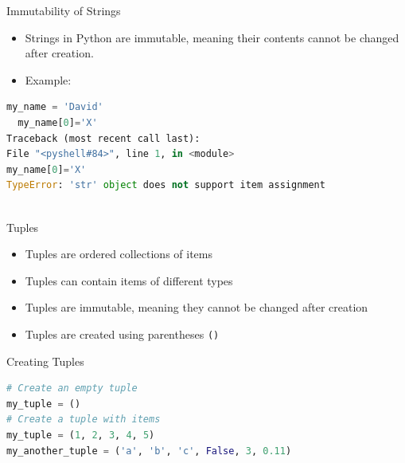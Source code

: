 \begin{frame}[fragile]{Immutability of Strings}
    \begin{itemize}
        \item Strings in Python are immutable, meaning their contents cannot be changed after creation.
        \item Example:
    \end{itemize}
    \begin{lstlisting}[language=Python]
  my_name = 'David'
  my_name[0]='X'
Traceback (most recent call last):
File "<pyshell#84>", line 1, in <module>
my_name[0]='X'
TypeError: 'str' object does not support item assignment
 
    \end{lstlisting}
\end{frame}

\begin{frame}{Tuples}
    \begin{itemize}
        \item Tuples are ordered collections of items
        \item Tuples can contain items of different types
        \item Tuples are immutable, meaning they cannot be changed after creation
        \item Tuples are created using parentheses \texttt{()}
    \end{itemize}
\end{frame} 

\begin{frame}[fragile]{Creating Tuples}
    \begin{lstlisting}[language=Python]
# Create an empty tuple
my_tuple = ()
# Create a tuple with items
my_tuple = (1, 2, 3, 4, 5)
my_another_tuple = ('a', 'b', 'c', False, 3, 0.11)
    \end{lstlisting}        
\end{frame}

